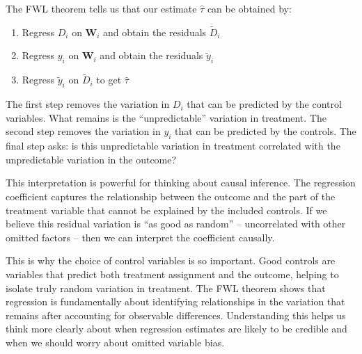 \documentclass[12pt]{article}
\begin{document}
\begin{multicols}{2}
The FWL theorem tells us that our estimate $\hat{\tau}$ can be obtained by:
\begin{enumerate}
\item Regress $D_i$ on $\bm{W}_i$ and obtain the residuals $\tilde{D}_i$
\item Regress $y_i$ on $\bm{W}_i$ and obtain the residuals $\tilde{y}_i$  
\item Regress $\tilde{y}_i$ on $\tilde{D}_i$ to get $\hat{\tau}$
\end{enumerate}

The first step removes the variation in $D_i$ that can be predicted by the control variables.
What remains is the ``unpredictable'' variation in treatment.
The second step removes the variation in $y_i$ that can be predicted by the controls.
The final step asks: is this unpredictable variation in treatment correlated with the unpredictable variation in the outcome?

This interpretation is powerful for thinking about causal inference.
The regression coefficient captures the relationship between the outcome and the part of the treatment variable that cannot be explained by the included controls.
If we believe this residual variation is ``as good as random'' -- uncorrelated with other omitted factors -- then we can interpret the coefficient causally.

This is why the choice of control variables is so important.
Good controls are variables that predict both treatment assignment and the outcome, helping to isolate truly random variation in treatment.
The FWL theorem shows that regression is fundamentally about identifying relationships in the variation that remains after accounting for observable differences.
Understanding this helps us think more clearly about when regression estimates are likely to be credible and when we should worry about omitted variable bias.

\end{multicols}
\end{document}

